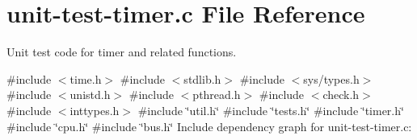 \hypertarget{unit-test-timer_8c}{}\section{unit-\/test-\/timer.c File Reference}
\label{unit-test-timer_8c}


Unit test code for timer and related functions.  


{\ttfamily \#include $<$time.\+h$>$}\newline
{\ttfamily \#include $<$stdlib.\+h$>$}\newline
{\ttfamily \#include $<$sys/types.\+h$>$}\newline
{\ttfamily \#include $<$unistd.\+h$>$}\newline
{\ttfamily \#include $<$pthread.\+h$>$}\newline
{\ttfamily \#include $<$check.\+h$>$}\newline
{\ttfamily \#include $<$inttypes.\+h$>$}\newline
{\ttfamily \#include \char`\"{}util.\+h\char`\"{}}\newline
{\ttfamily \#include \char`\"{}tests.\+h\char`\"{}}\newline
{\ttfamily \#include \char`\"{}timer.\+h\char`\"{}}\newline
{\ttfamily \#include \char`\"{}cpu.\+h\char`\"{}}\newline
{\ttfamily \#include \char`\"{}bus.\+h\char`\"{}}\newline
Include dependency graph for unit-\/test-\/timer.c\+:
